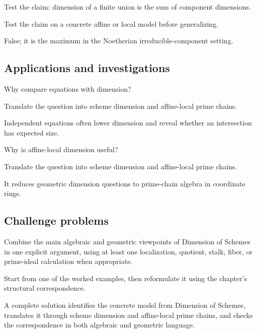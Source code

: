 \begin{exercise}\label{exr:vi30-expand-12}
Test the claim: dimension of a finite union is the sum of component dimensions.
\end{exercise}
\begin{hint}
Test the claim on a concrete affine or local model before generalizing.
\end{hint}
\begin{solution}
False; it is the maximum in the Noetherian irreducible-component setting.
\end{solution}

\subsection*{Applications and investigations}

\begin{exercise}\label{exr:vi30-expand-13}
Why compare equations with dimension?
\end{exercise}
\begin{hint}
Translate the question into scheme dimension and affine-local prime chains.
\end{hint}
\begin{solution}
Independent equations often lower dimension and reveal whether an intersection has expected size.
\end{solution}

\begin{exercise}\label{exr:vi30-expand-14}
Why is affine-local dimension useful?
\end{exercise}
\begin{hint}
Translate the question into scheme dimension and affine-local prime chains.
\end{hint}
\begin{solution}
It reduces geometric dimension questions to prime-chain algebra in coordinate rings.
\end{solution}

\subsection*{Challenge problems}

\begin{exercise}\label{exr:vi30-expand-15}
Combine the main algebraic and geometric viewpoints of Dimension of Schemes in one explicit argument, using at least one localization, quotient, stalk, fiber, or prime-ideal calculation when appropriate.
\end{exercise}
\begin{hint}
Start from one of the worked examples, then reformulate it using the chapter's structural correspondence.
\end{hint}
\begin{solution}
A complete solution identifies the concrete model from Dimension of Schemes, translates it through scheme dimension and affine-local prime chains, and checks the correspondence in both algebraic and geometric language.
\end{solution}


